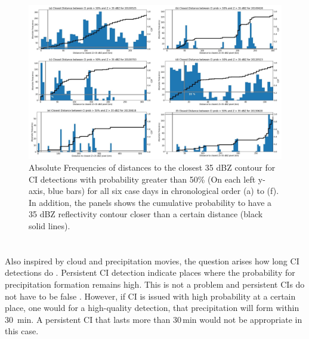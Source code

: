 \begin{figure}
\centering
\includegraphics[width=\textwidth]{Grafiken/Abbildungen/distance_CI50_RX35.jpg}
\caption{Absolute Frequencies of distances to the closest 35 dBZ contour for CI detections with probability greater than 50\% (On each left y-axis, blue bars) for all six case days in chronological order (a) to (f). In addition, the panels shows the cumulative probability to have a 35 dBZ reflectivity contour closer than a certain distance (black solid lines).}
\label{fig:distance_CI50-RX35}
\end{figure}

\section{}
Also inspired by  cloud and precipitation movies, the question arises how long CI detections do . Persistent CI detection indicate places where the probability for precipitation formation remains high. This is not  a problem  and persistent CIs do not have to be false . However, if CI is issued with high probability at a certain place, one would  for a high-quality detection, that precipitation will form within 30~min. A persistent CI that lasts more than 30\,min would not be appropriate in this case.


